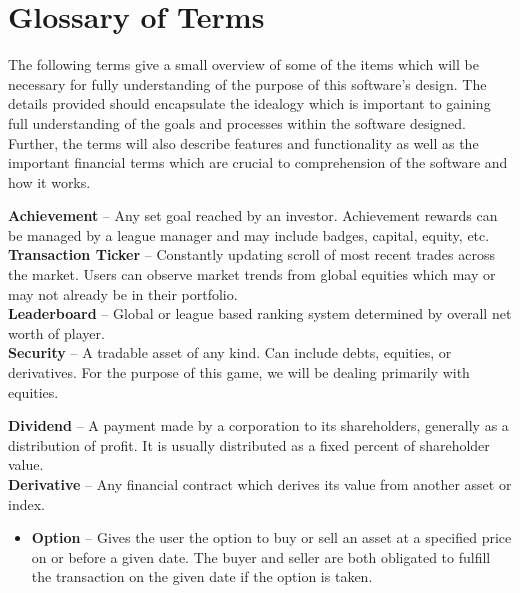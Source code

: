 \section{Glossary of Terms}


The following terms give a small overview of some of the items which will be
necessary for fully understanding of the purpose of this software's design.
The details provided should encapsulate the idealogy which is important to
gaining full understanding of the goals and processes within the software
designed. Further, the terms will also describe features and functionality as
well as the important financial terms which are crucial to comprehension of
the software and how it works.\\

{
\setlength{\parindent}{0cm}


\textbf{Achievement} -- Any set goal reached by an investor.
Achievement rewards can be managed by a league manager and
may include badges, capital, equity, etc.\\

\textbf{Transaction Ticker} -- Constantly updating scroll of
most recent trades across the market. Users can observe market
trends from global equities which may or may not already be
in their portfolio.\\

\textbf{Leaderboard} -- Global or league based ranking system
determined by overall net worth of player.\\

\textbf{Security} -- A tradable asset of any kind. Can include
debts, equities, or derivatives. For the purpose of this game,
we will be dealing primarily with equities.\newline

\textbf{Dividend} -- A payment made by a corporation to its
shareholders, generally as a distribution of profit. It is
usually distributed as a fixed percent of shareholder value.\\

\textbf{Derivative} -- Any financial contract which derives its
value from another asset or index.\\

\begin{itemize}
    \item \textbf{Option} -- Gives the user the option to buy or sell an
asset at a specified price on or before a given date. The buyer
and seller are both obligated to fulfill the transaction on the
given date if the option is taken.\\


\end{itemize}}
